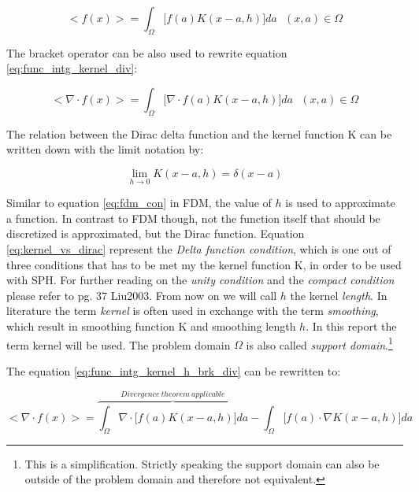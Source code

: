 \begin{equation} \label{eq:func_intg_kernel_h_brk}
< f(x) > = \int_{\Omega} \biggl [ f(a) K(x-a, h) \biggr ] d a \ \ \ (x, a) \in \Omega
\end{equation}

The bracket operator can be also used to rewrite equation \ref{eq:func_intg_kernel_div}:

\begin{equation} \label{eq:func_intg_kernel_h_brk_div}
< \nabla \cdot f(x) > = \int_{\Omega} \biggl [ \nabla \cdot f(a) K(x-a, h) \biggr ] d a \ \ \ (x, a) \in \Omega
\end{equation}

The relation between the Dirac delta function and the kernel function K can be written down with the limit notation by:

\begin{equation} \label{eq:kernel_vs_dirac}
\lim_{h \to 0} K(x-a, h) = \delta(x-a)
\end{equation}

Similar to equation \ref{eq:fdm_con} in FDM, the value of $ h $ is used to approximate a function. In contrast to FDM though, not the function itself that should be discretized is approximated, but the Dirac function. Equation \ref{eq:kernel_vs_dirac} represent the \emph{Delta function condition}, which is one out of three conditions that has to be met my the kernel function K, in order to be used with SPH. For further reading on the \emph{unity condition} and the \emph{compact condition} please refer to pg. 37 Liu2003. From now on we will call $ h $ the kernel \emph{length}. In literature the term \emph{kernel} is often used in exchange with the term \emph{smoothing}, which result in smoothing function K and smoothing length $h$. In this report the term kernel will be used. The problem domain $ \Omega $ is also called \emph{support domain}.\footnote{This is a simplification. Strictly speaking the support domain can also be outside of the problem domain and therefore not equivalent.}  

The equation \ref{eq:func_intg_kernel_h_brk_div} can be rewritten to: 

\begin{equation} \label{eq:func_intg_kernel_h_brk_div}
< \nabla \cdot f(x) > = 
\overbrace{\int_{\Omega} \nabla \cdot \biggl [ f(a) K(x-a, h) \biggr ] d a}^{Divergence\ theorem\ applicable} -
\int_{\Omega} \biggl [ f(a) \cdot \nabla K(x-a, h) \biggr ] d a
\end{equation}

